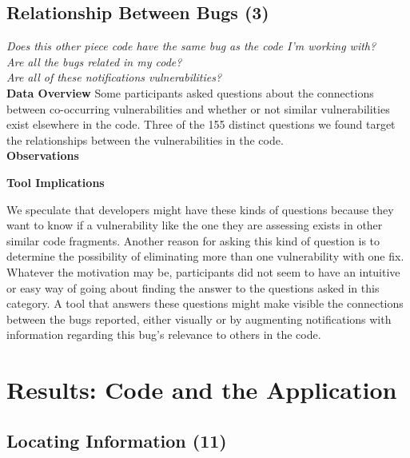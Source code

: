 \documentclass[conference]{IEEEtran}
\begin{document}

\noindent\subsection{\textbf{Relationship Between Bugs (3)}}\label{rbb}

\noindent\emph{Does this other piece code have the same bug as the code I'm working with?} \\
\emph{Are all the bugs related in my code?} \\
\emph{Are all of these notifications vulnerabilities?} \\


\noindent\textbf{Data Overview}
Some participants asked questions about the connections between co-occurring vulnerabilities and whether or not similar vulnerabilities exist elsewhere in the code. 
Three of the 155 distinct questions we found target the relationships between the vulnerabilities in the code. 
\\

\noindent\textbf{Observations}

\noindent\textbf{Tool Implications}

We speculate that developers might have these kinds of questions because they want to know if a vulnerability like the one they are assessing exists in other similar code fragments.
Another reason for asking this kind of question is to determine the possibility of eliminating more than one vulnerability with one fix. 
Whatever the motivation may be, participants did not seem to have an intuitive or easy way of going about finding the answer to the questions asked in this category.
A tool that answers these questions might make visible the connections between the bugs reported, either visually or by augmenting notifications with information regarding this bug's relevance to others in the code.



\section{Results: Code and the Application}
\label{sec:results-ca}





\noindent\subsection{\textbf{Locating Information (11)}}\label{li}
\end{document}
